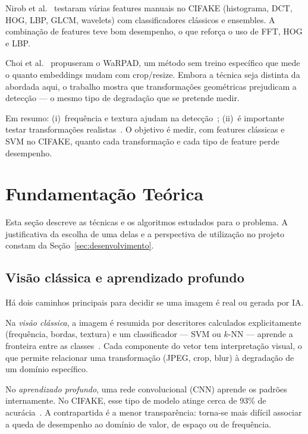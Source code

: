 \documentclass[12pt]{article}
\begin{document}
Nirob et al.~\cite{nirob2026handcrafted} testaram várias features manuais no CIFAKE (histograma, DCT, HOG, LBP, GLCM, wavelets) com classificadores clássicos e ensembles. A combinação de features teve bom desempenho, o que reforça o uso de FFT, HOG e LBP.

Choi et al.~\cite{choi2025warpad} propuseram o WaRPAD, um método sem treino específico que mede o quanto embeddings mudam com crop/resize. Embora a técnica seja distinta da abordada aqui, o trabalho mostra que transformações geométricas prejudicam a detecção --- o mesmo tipo de degradação que se pretende medir.

Em resumo: (i)~frequência e textura ajudam na detecção~\cite{frank2020frequency,bammey2024synthbuster,nirob2026handcrafted}; (ii)~é importante testar transformações realistas~\cite{choi2025warpad,bammey2024synthbuster}. O objetivo é medir, com features clássicas e SVM no CIFAKE, quanto cada transformação e cada tipo de feature perde desempenho.

\section{Fundamentação Teórica}
\label{sec:fundamentacao}

Esta seção descreve as técnicas e os algoritmos estudados para o problema. A justificativa da escolha de uma delas e a perspectiva de utilização no projeto constam da Seção~\ref{sec:desenvolvimento}.

\subsection{Visão clássica e aprendizado profundo}

Há dois caminhos principais para decidir se uma imagem é real ou gerada por IA.

Na \emph{visão clássica}, a imagem é resumida por descritores calculados explicitamente (frequência, bordas, textura) e um classificador --- SVM ou $k$-NN --- aprende a fronteira entre as classes~\cite{gonzalez2018,nirob2026handcrafted}. Cada componente do vetor tem interpretação visual, o que permite relacionar uma transformação (JPEG, crop, blur) à degradação de um domínio específico.

No \emph{aprendizado profundo}, uma rede convolucional (CNN) aprende os padrões internamente. No CIFAKE, esse tipo de modelo atinge cerca de 93\% de acurácia~\cite{bird2024cifake}. A contrapartida é a menor transparência: torna-se mais difícil associar a queda de desempenho ao domínio de valor, de espaço ou de frequência.
\end{document}

